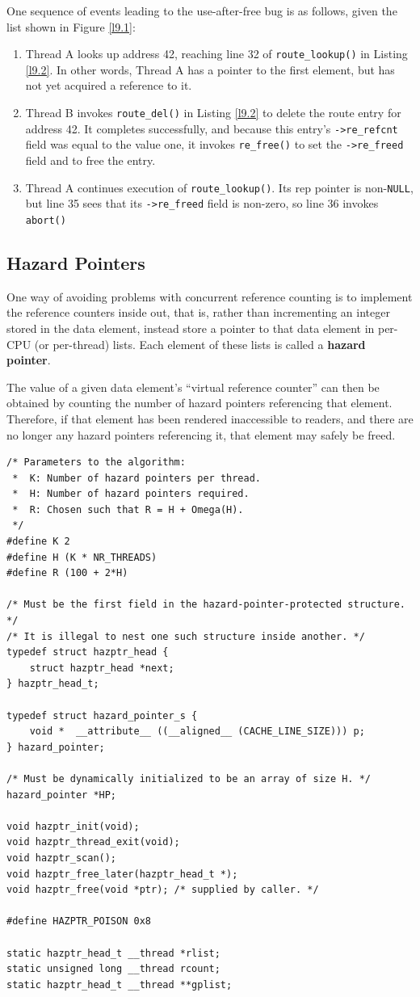 \documentclass[11pt]{article}
\begin{document}
One sequence of events leading to the use-after-free bug is as follows, given the list shown in Figure \ref{l9.1}:
\begin{enumerate}
\item Thread A looks up address 42, reaching line 32 of \texttt{route\_lookup()} in Listing \ref{l9.2}. In other
words, Thread A has a pointer to the first element, but has not yet acquired a reference to it.
\item Thread B invokes \texttt{route\_del()} in Listing \ref{l9.2} to delete the route entry for address 42. It
completes successfully, and because this entry’s \texttt{->re\_refcnt} field was equal to the value one, it
invokes \texttt{re\_free()} to set the \texttt{->re\_freed} field and to free the entry.
\item Thread A continues execution of \texttt{route\_lookup()}. Its rep pointer is non-\texttt{NULL}, but line 35 sees that
its \texttt{->re\_freed} field is non-zero, so line 36 invokes \texttt{abort()}
\end{enumerate}
\subsection{Hazard Pointers}
\label{sec:orgeb3ee58}
\label{c9.3}
One way of avoiding problems with concurrent reference counting is to implement the reference counters
inside out, that is, rather than incrementing an integer stored in the data element, instead store a
pointer to that data element in per-CPU (or per-thread) lists. Each element of these lists is called a
\textbf{hazard pointer}.

The value of a given data element’s “virtual reference counter” can then be obtained by counting the
number of hazard pointers referencing that element. Therefore, if that element has been rendered
inaccessible to readers, and there are no longer any hazard pointers referencing it, that element may
safely be freed.

\begin{verbatim}
/* Parameters to the algorithm:
 *  K: Number of hazard pointers per thread.
 *  H: Number of hazard pointers required.
 *  R: Chosen such that R = H + Omega(H).
 */
#define K 2
#define H (K * NR_THREADS)
#define R (100 + 2*H)

/* Must be the first field in the hazard-pointer-protected structure. */
/* It is illegal to nest one such structure inside another. */
typedef struct hazptr_head {
	struct hazptr_head *next;
} hazptr_head_t;

typedef struct hazard_pointer_s {
	void *  __attribute__ ((__aligned__ (CACHE_LINE_SIZE))) p;
} hazard_pointer;

/* Must be dynamically initialized to be an array of size H. */
hazard_pointer *HP;

void hazptr_init(void);
void hazptr_thread_exit(void);
void hazptr_scan();
void hazptr_free_later(hazptr_head_t *);
void hazptr_free(void *ptr); /* supplied by caller. */

#define HAZPTR_POISON 0x8

static hazptr_head_t __thread *rlist;
static unsigned long __thread rcount;
static hazptr_head_t __thread **gplist;
\end{verbatim}
\end{document}
